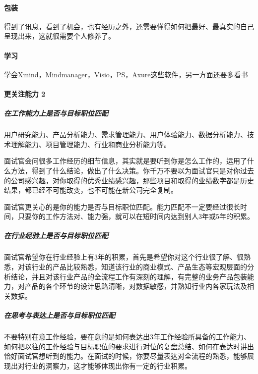 \documentclass[letterpaper,11pt,english]{sphinxmanual}
\begin{document}
\paragraph{包装}
\label{\detokenize{chapter_interview/new_like:id7}}
得到了讯息，看到了机会，也有经历之外，还需要懂得如何把最好、最真实的自己呈现出来，这就很需要个人修养了。


\paragraph{学习}
\label{\detokenize{chapter_interview/new_like:id8}}
学会Xmind，Mindmanager，Visio，PS，Axure这些软件，另一方面还要多看书


\paragraph{更关注能力 2\sphinxfootnotemark[789]}
\label{\detokenize{chapter_interview/new_like:id9}}%
\begin{footnotetext}[789]\sphinxAtStartFootnote
{}
%
\end{footnotetext}\ignorespaces 

\subparagraph{在工作能力上是否与目标职位匹配}
\label{\detokenize{chapter_interview/new_like:id10}}
用户研究能力、产品分析能力、需求管理能力、用户体验能力、数据分析能力、技术理解能力、项目管理能力、行业和商业分析能力等。

面试官会问很多工作经历的细节信息，其实就是要听到你是怎么工作的，运用了什么方法，得到了什么结论，做出了什么决策。你千万不要以为面试官只是对你过去的公司感兴趣，对你取得的优秀业绩感兴趣，那些项目和取得的业绩数字都是历史结果，都已经不可能改变，也不可能在新公司完全复制。

面试官更关心的是你的能力是否与目标职位匹配。能力匹配不一定要经过很长时间，只要你的工作方法对、能力强，就可以在短时间内达到别人3年或5年的积累。


\subparagraph{在行业经验上是否与目标职位匹配}
\label{\detokenize{chapter_interview/new_like:id11}}
面试官希望你在行业经验上有3年的积累，首先是希望你对这个行业很了解、很熟悉，对该行业的产品比较熟悉，知道该行业的商业模式、产品生态等宏观层面的分析结论，并且对该行业产品的全流程工作有深刻的理解，有完整的业务产品包装能力，对产品的各个环节的设计思路清晰，对数据敏感，并熟知行业内各家玩法及相关数据。


\subparagraph{在思考与表达上是否与目标职位匹配}
\label{\detokenize{chapter_interview/new_like:id12}}
不要特别在意工作经验，要在意的是如何表达出3年工作经验所具备的工作能力、如何把以往的工作经验与目标职位的要求进行对位的复盘总结、如何在表达时讲出恰好面试官想听到的能力。在面试的时候，你要尽量表达对全流程的熟悉，能够展现出对行业的洞察力，这才能够体现出你有一定的行业积累。
\end{document}
